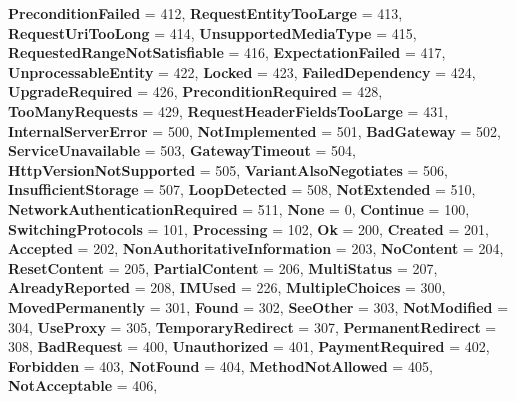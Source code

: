 \begin{DoxyCompactItemize}
{\bfseries Precondition\+Failed} = 412, 
{\bfseries Request\+Entity\+Too\+Large} = 413, 
\newline
{\bfseries Request\+Uri\+Too\+Long} = 414, 
{\bfseries Unsupported\+Media\+Type} = 415, 
{\bfseries Requested\+Range\+Not\+Satisfiable} = 416, 
{\bfseries Expectation\+Failed} = 417, 
\newline
{\bfseries Unprocessable\+Entity} = 422, 
{\bfseries Locked} = 423, 
{\bfseries Failed\+Dependency} = 424, 
{\bfseries Upgrade\+Required} = 426, 
\newline
{\bfseries Precondition\+Required} = 428, 
{\bfseries Too\+Many\+Requests} = 429, 
{\bfseries Request\+Header\+Fields\+Too\+Large} = 431, 
{\bfseries Internal\+Server\+Error} = 500, 
\newline
{\bfseries Not\+Implemented} = 501, 
{\bfseries Bad\+Gateway} = 502, 
{\bfseries Service\+Unavailable} = 503, 
{\bfseries Gateway\+Timeout} = 504, 
\newline
{\bfseries Http\+Version\+Not\+Supported} = 505, 
{\bfseries Variant\+Also\+Negotiates} = 506, 
{\bfseries Insufficient\+Storage} = 507, 
{\bfseries Loop\+Detected} = 508, 
\newline
{\bfseries Not\+Extended} = 510, 
{\bfseries Network\+Authentication\+Required} = 511, 
{\bfseries None} = 0, 
{\bfseries Continue} = 100, 
\newline
{\bfseries Switching\+Protocols} = 101, 
{\bfseries Processing} = 102, 
{\bfseries Ok} = 200, 
{\bfseries Created} = 201, 
\newline
{\bfseries Accepted} = 202, 
{\bfseries Non\+Authoritative\+Information} = 203, 
{\bfseries No\+Content} = 204, 
{\bfseries Reset\+Content} = 205, 
\newline
{\bfseries Partial\+Content} = 206, 
{\bfseries Multi\+Status} = 207, 
{\bfseries Already\+Reported} = 208, 
{\bfseries I\+M\+Used} = 226, 
\newline
{\bfseries Multiple\+Choices} = 300, 
{\bfseries Moved\+Permanently} = 301, 
{\bfseries Found} = 302, 
{\bfseries See\+Other} = 303, 
\newline
{\bfseries Not\+Modified} = 304, 
{\bfseries Use\+Proxy} = 305, 
{\bfseries Temporary\+Redirect} = 307, 
{\bfseries Permanent\+Redirect} = 308, 
\newline
{\bfseries Bad\+Request} = 400, 
{\bfseries Unauthorized} = 401, 
{\bfseries Payment\+Required} = 402, 
{\bfseries Forbidden} = 403, 
\newline
{\bfseries Not\+Found} = 404, 
{\bfseries Method\+Not\+Allowed} = 405, 
{\bfseries Not\+Acceptable} = 406, 

\end{DoxyCompactItemize}
